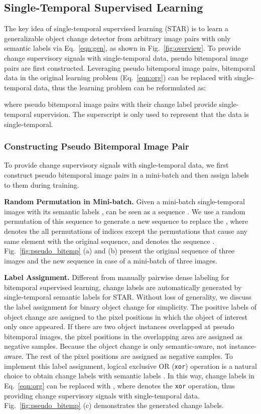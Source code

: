 \documentclass[10pt,twocolumn,letterpaper]{article}
\begin{document}
\subsection{Single-Temporal Supervised Learning}
The key idea of single-temporal supervised learning (STAR) is to learn a generalizable object change detector from arbitrary image pairs with only semantic labels via Eq.~\ref{eqn:gen}, as shown in Fig.~\ref{fig:overview}.
To provide change supervisory signals with single-temporal data, pseudo bitemporal image pairs are first constructed.
Leveraging pseudo bitemporal image pairs, bitemporal data in the original learning problem (Eq.~\ref{eqn:org}) can be replaced with single-temporal data, thus the learning problem can be reformulated as:

where pseudo bitemporal image pairs  with their change label  provide single-temporal supervision.
The superscript  is only used to represent that the data is single-temporal.

\subsubsection{Constructing Pseudo Bitemporal Image Pair}
To provide change supervisory signals with single-temporal data, we first construct pseudo bitemporal image pairs in a mini-batch and then assign labels to them during training.

\noindent  \textbf{Random Permutation in Mini-batch.}
Given a mini-batch single-temporal images  with its semantic labels ,  can be seen as a sequence .
We use a random permutation  of this sequence to generate a new sequence  to replace the , where  denotes the all permutations of indices  except the permutations that cause any same element with the original sequence, and  denotes the sequence .
Fig.~\ref{fig:pseudo_bitemp} (a) and (b) present the original sequence of three images and the new sequence in case of a mini-batch of three images.

\noindent \textbf{Label Assignment.}
Different from manually pairwise dense labeling for bitemporal supervised learning, change labels are automatically generated by single-temporal semantic labels for STAR.
Without loss of generality, we discuss the label assignment for binary object change for simplicity. 
The positive labels of object change are assigned to the pixel positions in which the object of interest only once appeared.
If there are two object instances overlapped at pseudo bitemporal images, the pixel positions in the overlapping area are assigned as negative samples.
Because the object change is only semantic-aware, not instance-aware.
The rest of the pixel positions are assigned as negative samples.
To implement this label assignment, logical exclusive OR (\texttt{xor}) operation is a natural choice to obtain change labels with semantic labels .
In this way, change labels  in Eq.~\ref{eqn:org} can be replaced with , where  denotes the \texttt{xor} operation, thus providing change supervisory signals with single-temporal data.
Fig.~\ref{fig:pseudo_bitemp} (c) demonstrates the generated change labels.
\end{document}
